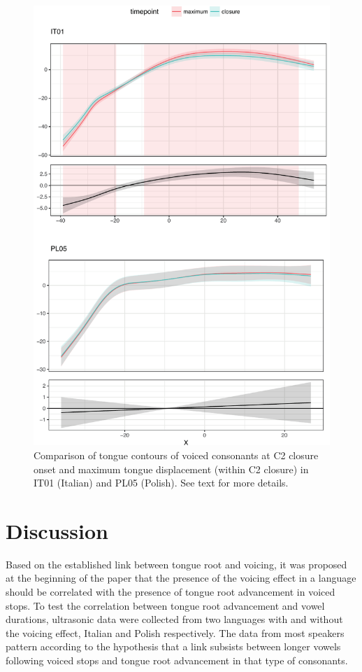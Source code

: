 \documentclass[authoryear, twocolumn]{elsarticle}
\begin{document}
\begin{figure}
    \centering
    \includegraphics[height=.9\textheight]{fig/voiced.pdf}
    \caption{Comparison of tongue contours of voiced consonants at C2 closure onset and maximum tongue displacement (within C2 closure) in IT01 (Italian) and PL05 (Polish). See text for more details.}
    \label{f:voiced}
\end{figure}

\section{Discussion}\label{discussion}

\label{s:discussion}

Based on the established link between tongue root and voicing, it was
proposed at the beginning of the paper that the presence of the voicing
effect in a language should be correlated with the presence of tongue
root advancement in voiced stops. To test the correlation between tongue
root advancement and vowel durations, ultrasonic data were collected
from two languages with and without the voicing effect, Italian and
Polish respectively. The data from most speakers pattern according to
the hypothesis that a link subsists between longer vowels following
voiced stops and tongue root advancement in that type of consonants.
\end{document}
